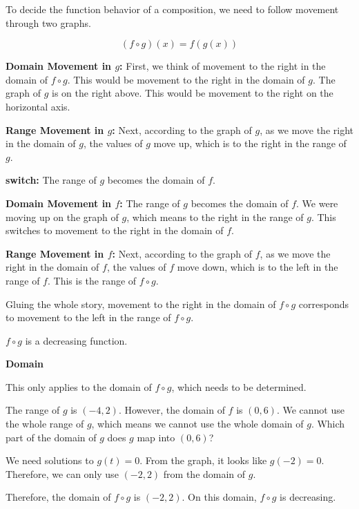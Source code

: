 \documentclass{ximera}
\begin{document}
To decide the function behavior of a composition, we need to follow movement through two graphs. 



\[
(f \circ g)(x) = f(g(x))
\]



\textbf{\textcolor{blue!55!black}{Domain Movement in $g$:}}  First, we think of movement to the right in the domain of $f \circ g$.  This would be movement to the right in the domain of $g$.  The graph of $g$ is on the right above.  This would be movement to the right on the horizontal axis.



\textbf{\textcolor{blue!55!black}{Range Movement in $g$:}}  Next, according to the graph of $g$, as we move the right in the domain of $g$, the values of $g$ move up, which is to the right in the range of $g$.




\textbf{\textcolor{blue!55!black}{switch:}}   The range of $g$ becomes the domain of $f$.  


\textbf{\textcolor{blue!55!black}{Domain Movement in $f$:}}   The range of $g$ becomes the domain of $f$.  We were moving up on the graph of $g$, which means to the right in the range of $g$.  This switches to movement to the right in the domain of $f$.


\textbf{\textcolor{blue!55!black}{Range Movement in $f$:}}  Next, according to the graph of $f$, as we move the right in the domain of $f$, the values of $f$ move down, which is to the left in the range of $f$.  This is the range of $f \circ g$.




Gluing the whole story, movement to the right in the domain of $f \circ g$ corresponds to movement to the left in the range of $f \circ g$.

$f \circ g$ is a decreasing function.



\begin{observation} \textbf{\textcolor{-red!75}{Domain}}


This only applies to the domain of $f \circ g$, which needs to be determined. 



The range of $g$ is $(-4, 2)$.  However, the domain of $f$ is $(0, 6)$.   We cannot use the whole range of $g$, which means we cannot use the whole domain of $g$.  Which part of the domain of $g$ does $g$ map into $(0, 6)$? 


We need solutions to $g(t) = 0$.  From the graph, it looks like $g(-2) = 0$.  Therefore, we can only use $(-2, 2)$ from the domain of $g$.


Therefore, the domain of $f \circ g$ is $(-2, 2)$.  On this domain, $f \circ g$ is decreasing.



\end{observation}
\end{document}
